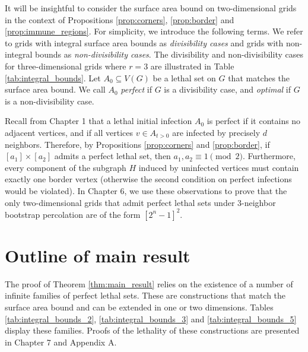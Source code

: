 It will be insightful to consider the surface area bound on two-dimensional grids in the context of Propositions \ref{prop:corners}, \ref{prop:border} and \ref{prop:immune_regions}. For simplicity, we introduce the following terms. We refer to grids with integral surface area bounds as \emph{divisibility cases} and grids with non-integral bounds as \emph{non-divisibility cases}. The divisibility and non-divisibility cases for three-dimensional grids where $r=3$ are illustrated in Table \ref{tab:integral_bounds}. Let $A_0 \subseteq V(G)$ be a lethal set on $G$ that matches the surface area bound. We call $A_0$ \emph{perfect} if $G$ is a divisibility case, and \emph{optimal} if $G$ is a non-divisibility case. 

Recall from Chapter 1 that a lethal initial infection $A_0$ is perfect if it contains no adjacent vertices, and if all vertices $v \in A_{t > 0}$ are infected by precisely $d$ neighbors. Therefore, by Propositions \ref{prop:corners} and \ref{prop:border}, if  $[a_1] \times [a_2]$ admits a perfect lethal set, then $a_1, a_2 \equiv 1 \pmod 2$. Furthermore, every component of the subgraph $H$ induced by uninfected vertices must contain exactly one border vertex (otherwise the second condition on perfect infections would be violated). In Chapter 6, we use these observations to prove that the only two-dimensional grids that admit perfect lethal sets under 3-neighbor bootstrap percolation are of the form $[2^n-1]^2$.

\section{Outline of main result}


The proof of Theorem \ref{thm:main_result} relies on the existence of a number of infinite families of perfect lethal sets. These are constructions that match the surface area bound and can be extended in one or two dimensions. Tables \ref{tab:integral_bounds_2}, \ref{tab:integral_bounds_3} and \ref{tab:integral_bounds_5} display these families. Proofs of the lethality of these constructions are presented in Chapter 7 and Appendix A. 

